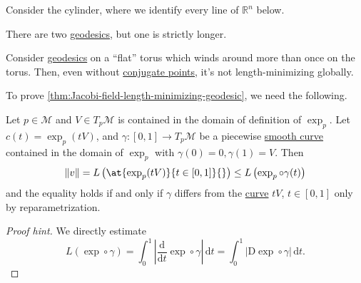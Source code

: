 \begin{eg}[Cylinder]
	Consider the cylinder, where we identify every line of \(\mathbb{R} ^n\) below.
	\begin{center}
	\end{center}
	There are two \hyperref[def:geodesic]{geodesics}, but one is strictly longer.
\end{eg}

\begin{eg}[Torus]
	Consider \hyperref[def:geodesic]{geodesics} on a ``flat'' torus which winds around more than once on the torus. Then, even without \hyperref[def:conjugate-point]{conjugate points}, it's not length-minimizing globally.
\end{eg}

To prove \autoref{thm:Jacobi-field-length-minimizing-geodesic}, we need the following.

\begin{corollary}\label{col:lec18}
	Let \(p\in \mathcal{M} \) and \(V\in T_p \mathcal{M} \) is contained in the domain of definition of \(\exp _p\). Let \(c(t) = \exp _p(t V)\), and \(\gamma \colon [0, 1] \to T_p \mathcal{M} \) be a piecewise \hyperref[def:curve]{smooth curve}  contained in the domain of \(\exp _p\) with \(\gamma (0) = 0, \gamma (1) = V\). Then
	\[
		\lVert v \rVert
		= L \left( \at{\exp _p(tV)}{t\in[0, 1]}{}  \right)
		\leq L \left( \exp _p \circ \gamma (t) \right)
	\]
	and the equality holds if and only if \(\gamma \) differs from the \hyperref[def:curve]{curve} \(tV\), \(t\in[0, 1]\) only by reparametrization.
\end{corollary}
\begin{proof}[Proof hint]
	We directly estimate
	\[
		L(\exp \circ \gamma )
		= \int_{0}^{1} \left\vert \frac{\mathrm{d}}{\mathrm{d}t} \exp \circ \gamma \right\vert \,\mathrm{d}t
		= \int_{0}^{1} \vert \mathrm{D} \exp \circ \gamma  \vert  \,\mathrm{d}t.
	\]
\end{proof}